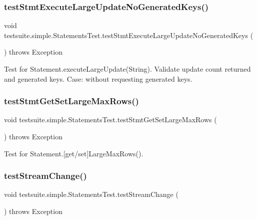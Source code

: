 \subsubsection{\texorpdfstring{test\+Stmt\+Execute\+Large\+Update\+No\+Generated\+Keys()}{testStmtExecuteLargeUpdateNoGeneratedKeys()}}
{\footnotesize\ttfamily void testsuite.\+simple.\+Statements\+Test.\+test\+Stmt\+Execute\+Large\+Update\+No\+Generated\+Keys (\begin{DoxyParamCaption}{ }\end{DoxyParamCaption}) throws Exception}

Test for Statement.\+execute\+Large\+Update(\+String). Validate update count returned and generated keys. Case\+: without requesting generated keys. \mbox{\label{classtestsuite_1_1simple_1_1_statements_test_a0b4ba896da3713e9f09a7af0ecf64115}} 
\subsubsection{\texorpdfstring{test\+Stmt\+Get\+Set\+Large\+Max\+Rows()}{testStmtGetSetLargeMaxRows()}}
{\footnotesize\ttfamily void testsuite.\+simple.\+Statements\+Test.\+test\+Stmt\+Get\+Set\+Large\+Max\+Rows (\begin{DoxyParamCaption}{ }\end{DoxyParamCaption}) throws Exception}

Test for Statement.\mbox{[}get/set\mbox{]}Large\+Max\+Rows(). \mbox{\label{classtestsuite_1_1simple_1_1_statements_test_a732ef94880943b2889d9880a0e059b95}} 
\subsubsection{\texorpdfstring{test\+Stream\+Change()}{testStreamChange()}}
{\footnotesize\ttfamily void testsuite.\+simple.\+Statements\+Test.\+test\+Stream\+Change (\begin{DoxyParamCaption}{ }\end{DoxyParamCaption}) throws Exception}

